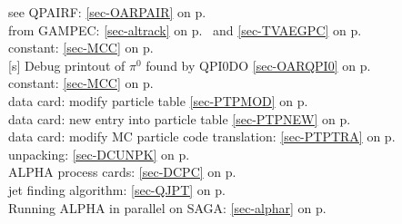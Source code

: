   see QPAIRF: \ref{sec-OARPAIR} on p.~\pageref{sec-OARPAIR}\\
  from GAMPEC: \ref{sec-altrack} on p.~\pageref{sec-altrack} and
 \ref{sec-TVAEGPC} on p.~\pageref{sec-TVAEGPC}\\
 constant: \ref{sec-MCC} on p.~\pageref{sec-MCC}\\
 [s] Debug printout of $\pi^0$ found by QPI0DO
 \ref{sec-OARQPI0} on p.~\pageref{sec-OARQPI0}\\
 constant: \ref{sec-MCC} on p.~\pageref{sec-MCC}\\
 data card: modify particle table \ref{sec-PTPMOD} on p.~\pageref{sec-PTPMOD}\\
 data card: new entry into particle table \ref{sec-PTPNEW}
 on p.~\pageref{sec-PTPNEW}\\
 data card: modify MC particle code translation:
 \ref{sec-PTPTRA} on p.~\pageref{sec-PTPTRA}\\
 unpacking: \ref{sec-DCUNPK} on p.~\pageref{sec-DCUNPK}\\
 ALPHA process cards: \ref{sec-DCPC} on p.~\pageref{sec-DCPC}\\
 jet finding algorithm: \ref{sec-QJPT} on p.~\pageref{sec-QJPT}\\
 Running ALPHA in parallel on SAGA: \ref{sec-alphar} on p.~\pageref{sec-alphar}
 
